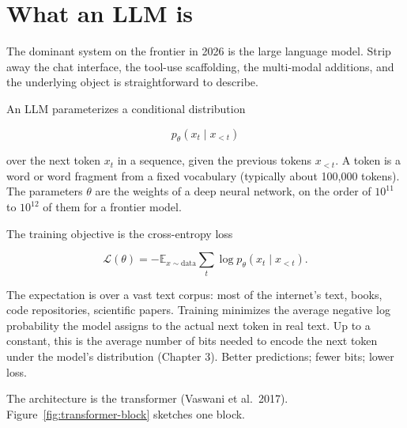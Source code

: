 \section*{What an LLM is}

The dominant system on the frontier in 2026 is the large language model. Strip away the chat interface, the tool-use scaffolding, the multi-modal additions, and the underlying object is straightforward to describe.

An LLM parameterizes a conditional distribution

$$p_\theta(x_t \mid x_{<t})$$

over the next token $x_t$ in a sequence, given the previous tokens $x_{<t}$. A token is a word or word fragment from a fixed vocabulary (typically about 100,000 tokens). The parameters $\theta$ are the weights of a deep neural network, on the order of $10^{11}$ to $10^{12}$ of them for a frontier model.

The training objective is the cross-entropy loss

$$\mathcal{L}(\theta) = -\mathbb{E}_{x \sim \text{data}}\sum_t \log p_\theta(x_t \mid x_{<t}).$$

The expectation is over a vast text corpus: most of the internet's text, books, code repositories, scientific papers. Training minimizes the average negative log probability the model assigns to the actual next token in real text. Up to a constant, this is the average number of bits needed to encode the next token under the model's distribution (Chapter 3). Better predictions; fewer bits; lower loss.

The architecture is the transformer (Vaswani et al.\ 2017). Figure~\ref{fig:transformer-block} sketches one block.

